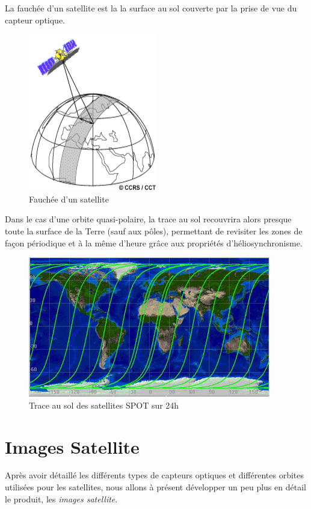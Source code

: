 \documentclass[a4paper, 10pt]{report}
\begin{document}
La fauchée d'un satellite est la la surface au sol couverte par la prise de vue du capteur optique.
\begin{figure}[H]
	\begin{center}
		\includegraphics[scale=0.4]{Images/Swath.png}
		\caption{Fauchée d'un satellite}
	\end{center}
\end{figure}
Dans le cas d'une orbite quasi-polaire, la trace au sol recouvrira alors presque toute la surface de la Terre (sauf aux pôles), permettant de revisiter les zones de façon périodique et à la même d'heure grâce aux propriétés d'héliosynchronisme.
\begin{figure}[H]
	\begin{center}
		\includegraphics[scale=0.5]{Images/Trace_Sol_SPOT.jpg}
		\caption{Trace au sol des satellites SPOT sur 24h}
	\end{center}
\end{figure}
\section{Images Satellite}
Après avoir détaillé les différents types de capteurs optiques et différentes orbites utilisées pour les satellites, nous allons à présent développer un peu plus en détail le produit, les \emph{images satellite}.
\end{document}
